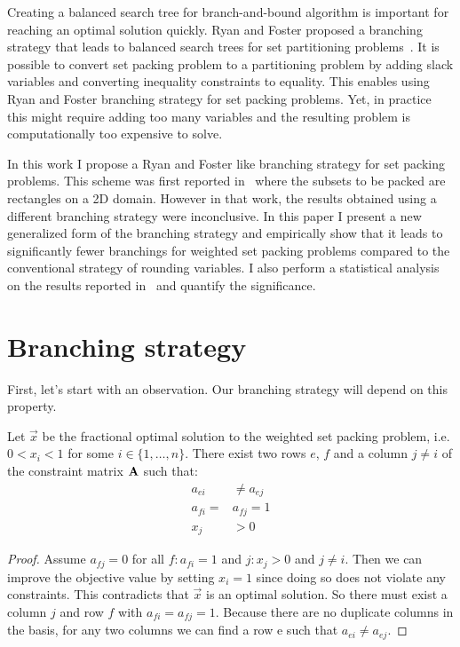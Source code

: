 \documentclass{article}
\begin{document}
Creating a balanced search tree for branch-and-bound algorithm is important for reaching an optimal solution quickly. Ryan and Foster proposed a branching strategy that leads to balanced search trees for set partitioning problems~\cite{RyanFoster1981}. It is possible to convert set packing problem to a partitioning problem by adding slack variables and converting inequality constraints to equality. This enables using Ryan and Foster branching strategy for set packing problems. Yet, in practice this might require adding too many variables and the resulting problem is computationally too expensive to solve. 

In this work I propose a Ryan and Foster like branching strategy for set packing problems. This scheme was first reported in~\cite{demiroz2019} where the subsets to be packed are rectangles on a 2D domain. However in that work, the results obtained using a different branching strategy were inconclusive. In this paper I present a new generalized form of the branching strategy and empirically show that it leads to significantly fewer branchings for weighted set packing problems compared to the conventional strategy of rounding variables. I also perform a statistical analysis on the results reported in~\cite{demiroz2019} and quantify the significance.

\section{Branching strategy}
\label{sec:branching-strategy}

First, let's start with an observation. Our branching strategy will depend on this property.

\begin{proposition}
Let $\vec{x}$ be the fractional optimal solution to the weighted set packing problem, i.e. $0 < x_i < 1$ for some $i\in\{1,\dots,n\}$. There exist two rows $e$, $f$ and a column $j\neq i$ of the constraint matrix $\mathbf{A}$ such that:
\begin{align*}
  a_{ei} &\neq a_{ej}\\
  a_{fi} = &a_{fj} = 1\\
  x_j &> 0
\end{align*}
\end{proposition}

\begin{proof} Assume $a_{fj}=0$ for all $f:a_{fi}=1$ and $j:x_j>0$ and $j\neq i$. Then we can improve the objective value by setting $x_i=1$ since doing so does not violate any constraints. This contradicts that $\vec{x}$ is an optimal solution. So there must exist a column $j$ and row $f$ with $a_{fi} = a_{fj} = 1$.
Because there are no duplicate columns in the basis, for any two columns we can find a row e such that $a_{ei} \neq a_{ej}$.
\end{proof}
\end{document}
